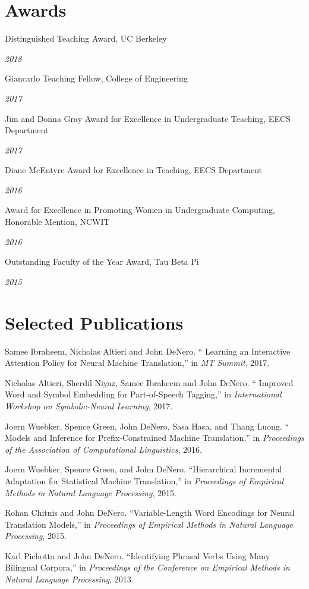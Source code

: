\documentclass[margin,line]{res}
\newcommand{\dated}[2]{\parbox[t]{4.4in}{#1} \hspace{0.4in}
											 \parbox[t]{1in}{ {\it #2 } } }
\begin{document}
\begin{resume}
\section{\sc Awards}

\dated{Distinguished Teaching Award, UC Berkeley} { 2018 }

\dated{Giancarlo Teaching Fellow, College of Engineering} { 2017 }

\dated{Jim and Donna Gray Award for Excellence in Undergraduate Teaching, EECS Department} { 2017 }

\dated{Diane McEntyre Award for Excellence in Teaching, EECS Department} { 2016 }

\dated{Award for Excellence in Promoting Women in Undergraduate Computing, Honorable Mention, NCWIT} { 2016 }

\dated{Outstanding Faculty of the Year Award, Tau Beta Pi} { 2015 }

\section{\sc Selected Publications}

\small

Samee Ibraheem, Nicholas Altieri and John DeNero. `` Learning an Interactive Attention Policy for Neural Machine Translation,'' in {\it MT Summit}, 2017.

Nicholas Altieri, Sherdil Niyaz, Samee Ibraheem and John DeNero. `` Improved Word and Symbol Embedding for Part-of-Speech Tagging,'' in {\it International Workshop on Symbolic-Neural Learning}, 2017.

Joern Wuebker, Spence Green, John DeNero, Sasa Hasa, and Thang Luong. `` Models and Inference for Prefix-Constrained Machine Translation,'' in {\it Proceedings of the Association of Computational Linguistics}, 2016.

Joern Wuebker, Spence Green, and John DeNero. ``Hierarchical Incremental Adaptation for Statistical Machine Translation,'' in {\it Proceedings of Empirical Methods in Natural Language Processing}, 2015.

Rohan Chitnis and John DeNero. ``Variable-Length Word Encodings for Neural Translation Models,'' in {\it Proceedings of Empirical Methods in Natural Language Processing}, 2015.

Karl Pichotta and John DeNero.  ``Identifying Phrasal Verbs Using Many Bilingual Corpora,'' in {\it Proceedings of the Conference on Empirical Methods in Natural Language Processing}, 2013.


\end{resume}
\end{document}
